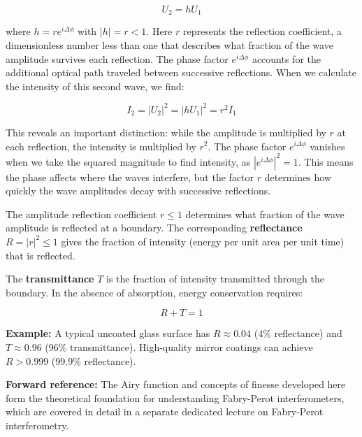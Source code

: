 \documentclass[
  a4paper,
]{book}
\begin{document}
\[
U_2=h U_1
\]

where \(h = re^{i\Delta\phi}\) with \(|h| = r < 1\). Here \(r\)
represents the reflection coefficient, a dimensionless number less than
one that describes what fraction of the wave amplitude survives each
reflection. The phase factor \(e^{i\Delta\phi}\) accounts for the
additional optical path traveled between successive reflections. When we
calculate the intensity of this second wave, we find:

\[
I_2=|U_2|^2=|h U_1|^2=r^2 I_1
\]

This reveals an important distinction: while the amplitude is multiplied
by \(r\) at each reflection, the intensity is multiplied by \(r^2\). The
phase factor \(e^{i\Delta\phi}\) vanishes when we take the squared
magnitude to find intensity, as \(|e^{i\Delta\phi}|^2 = 1\). This means
the phase affects where the waves interfere, but the factor \(r\)
determines how quickly the wave amplitudes decay with successive
reflections.

\begin{tcolorbox}[enhanced jigsaw, breakable, toptitle=1mm, bottomrule=.15mm, colbacktitle=quarto-callout-note-color!10!white, title=\textcolor{quarto-callout-note-color}{\faInfo}\hspace{0.5em}{Reflectance, Transmittance, and Energy Conservation}, arc=.35mm, rightrule=.15mm, bottomtitle=1mm, opacityback=0, toprule=.15mm, coltitle=black, leftrule=.75mm, opacitybacktitle=0.6, colback=white, left=2mm, titlerule=0mm, colframe=quarto-callout-note-color-frame]

The amplitude reflection coefficient \(r \le 1\) determines what
fraction of the wave amplitude is reflected at a boundary. The
corresponding \textbf{reflectance} \(R = |r|^2 \le 1\) gives the
fraction of intensity (energy per unit area per unit time) that is
reflected.

The \textbf{transmittance} \(T\) is the fraction of intensity
transmitted through the boundary. In the absence of absorption, energy
conservation requires:

\[
R+T=1
\]

\textbf{Example:} A typical uncoated glass surface has
\(R \approx 0.04\) (4\% reflectance) and \(T \approx 0.96\) (96\%
transmittance). High-quality mirror coatings can achieve \(R > 0.999\)
(99.9\% reflectance).

\textbf{Forward reference:} The Airy function and concepts of finesse
developed here form the theoretical foundation for understanding
Fabry-Perot interferometers, which are covered in detail in a separate
dedicated lecture on Fabry-Perot interferometry.

\end{tcolorbox}
\end{document}
